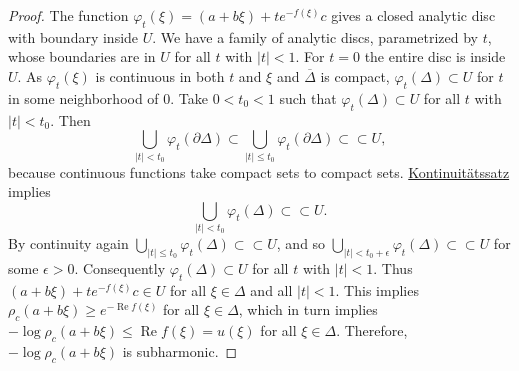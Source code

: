 \documentclass[12pt,openany]{book}
\renewcommand{\Re}{\operatorname{Re}}
\newcommand{\sabs}[1]{\lvert {#1} \rvert}
\theoremstyle{plain}
\theoremstyle{remark}
\theoremstyle{definition}
\theoremstyle{exercise}
\theoremstyle{example}
\begin{document}
\begin{proof}
The function $\varphi_t(\xi) = 
(a+b\xi)+te^{-f(\xi)}c$ gives a closed analytic disc with boundary inside
$U$.  We have a family of analytic discs, parametrized by $t$, whose boundaries are in
$U$ for all $t$ with $\sabs{t} < 1$.  For $t=0$ the entire disc is
inside $U$.  As $\varphi_t(\xi)$ is continuous in both $t$ and $\xi$ and
$\overline{\Delta}$ is compact,
$\varphi_t(\Delta) \subset U$ for $t$ in some neighborhood of $0$.
Take $0 < t_0 < 1$ such that
$\varphi_t(\Delta) \subset U$ for all $t$ with $\sabs{t} < t_0$.
Then
\begin{equation*}
\bigcup_{\sabs{t} < t_0} \varphi_t(\partial \Delta)
\subset
\bigcup_{\sabs{t} \leq t_0} \varphi_t(\partial \Delta)
\subset \subset U ,
\end{equation*}
because continuous functions take compact sets to compact sets.
\hyperref[thm:contprinciple]{Kontinuit\"atssatz}
implies 
\begin{equation*}
\bigcup_{\sabs{t} < t_0} \varphi_t(\Delta)
\subset \subset U  .
\end{equation*}
By continuity again
$\bigcup_{\sabs{t} \leq t_0} \varphi_t(\Delta)
\subset \subset U$, and so
$\bigcup_{\sabs{t} < t_0+\epsilon} \varphi_t(\Delta)
\subset \subset U$
for some $\epsilon > 0$.
Consequently $\varphi_t(\Delta) \subset U$
for all $t$ with $\sabs{t} < 1$.  Thus
$(a+b\xi)+te^{-f(\xi)}c \in U$ for all $\xi \in \Delta$ and all $\sabs{t} <
1$.  This implies $\rho_c(a+b\xi) \geq e^{-\Re f(\xi)}$ for all $\xi \in
\Delta$, which in
turn implies $-\log \rho_c(a+b\xi) \leq \Re f(\xi) = u(\xi)$ for all $\xi
\in \Delta$. 
Therefore, $-\log \rho_c(a+b\xi)$ is subharmonic.
\end{proof}
\end{document}
